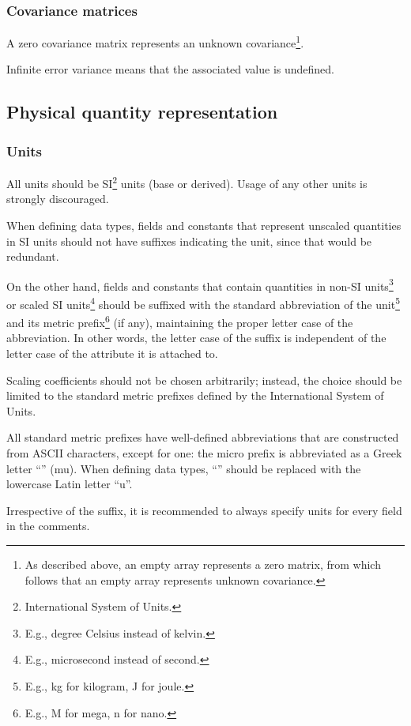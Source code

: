 \subsubsection{Covariance matrices}

A zero covariance matrix represents an unknown covariance\footnote{%
    As described above, an empty array represents a zero matrix,
    from which follows that an empty array represents unknown covariance.
}.

Infinite error variance means that the associated value is undefined.

\subsection{Physical quantity representation}

\subsubsection{Units}

All units should be SI\footnote{International System of Units.} units (base or derived).
Usage of any other units is strongly discouraged.

When defining data types, fields and constants that represent unscaled quantities in SI units
should not have suffixes indicating the unit, since that would be redundant.

On the other hand, fields and constants that contain quantities in
non-SI units\footnote{E.g., degree Celsius instead of kelvin.}
or scaled SI units\footnote{E.g., microsecond instead of second.}
should be suffixed with the standard abbreviation of the unit\footnote{E.g., kg for kilogram, J for joule.}
and its metric prefix\footnote{E.g., M for mega, n for nano.}
(if any), maintaining the proper letter case of the abbreviation.
In other words, the letter case of the suffix is independent of the letter case of
the attribute it is attached to.

Scaling coefficients should not be chosen arbitrarily;
instead, the choice should be limited to the standard metric prefixes defined by the
International System of Units.

All standard metric prefixes have well-defined abbreviations that are constructed from ASCII characters,
except for one: the micro prefix is abbreviated as a Greek letter ``\textmu{}'' (mu).
When defining data types, ``\textmu{}'' should be replaced with the lowercase Latin letter ``u''.

Irrespective of the suffix, it is recommended to always specify units for every field in the comments.

